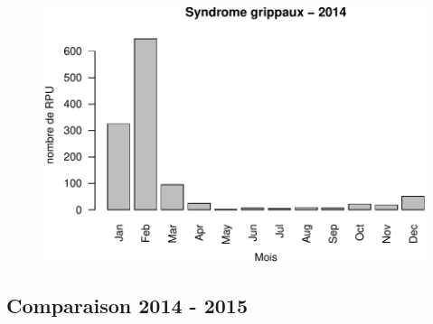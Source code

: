 \documentclass[]{article}
\begin{document}
\begin{figure}[htbp]
\centering
\includegraphics{dp_files/figure-latex/grippe-1.pdf}
\end{figure}

\subsection{Comparaison 2014 - 2015}\label{comparaison-2014---2015}
\end{document}
